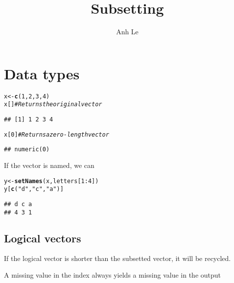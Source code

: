 \documentclass{article}\usepackage[]{graphicx}\usepackage[]{color}
\title{Subsetting}
\author{Anh Le}
\makeatletter
\newcommand{\hlnum}[1]{\textcolor[rgb]{0.686,0.059,0.569}{#1}}%
\newcommand{\hlstr}[1]{\textcolor[rgb]{0.192,0.494,0.8}{#1}}%
\newcommand{\hlcom}[1]{\textcolor[rgb]{0.678,0.584,0.686}{\textit{#1}}}%
\newcommand{\hlopt}[1]{\textcolor[rgb]{0,0,0}{#1}}%
\newcommand{\hlstd}[1]{\textcolor[rgb]{0.345,0.345,0.345}{#1}}%
\newcommand{\hlkwb}[1]{\textcolor[rgb]{0.69,0.353,0.396}{#1}}%
\newcommand{\hlkwd}[1]{\textcolor[rgb]{0.737,0.353,0.396}{\textbf{#1}}}%
\newenvironment{kframe}{%
 \def\at@end@of@kframe{}%
 \ifinner\ifhmode%
  \def\at@end@of@kframe{\end{minipage}}%
  \begin{minipage}{\columnwidth}%
 \fi\fi%
 \def\FrameCommand##1{\hskip\@totalleftmargin \hskip-\fboxsep
 \colorbox{shadecolor}{##1}\hskip-\fboxsep
     \hskip-\linewidth \hskip-\@totalleftmargin \hskip\columnwidth}%
 \MakeFramed {\advance\hsize-\width
   \@totalleftmargin\z@ \linewidth\hsize
   \@setminipage}}%
 {\par\unskip\endMakeFramed%
 \at@end@of@kframe}
\newenvironment{knitrout}{}{} %
\makeatother
\begin{document}
\maketitle

\section{Data types}

\begin{knitrout}
\color{fgcolor}\begin{kframe}
\begin{alltt}
\hlstd{x} \hlkwb{<-} \hlkwd{c}\hlstd{(}\hlnum{1}\hlstd{,} \hlnum{2}\hlstd{,} \hlnum{3}\hlstd{,} \hlnum{4}\hlstd{)}
\hlstd{x[]} \hlcom{# Returns the original vector}
\end{alltt}
\begin{verbatim}
## [1] 1 2 3 4
\end{verbatim}
\begin{alltt}
\hlstd{x[}\hlnum{0}\hlstd{]} \hlcom{# Returns a zero-length vector}
\end{alltt}
\begin{verbatim}
## numeric(0)
\end{verbatim}
\end{kframe}
\end{knitrout}

If the vector is named, we can
\begin{knitrout}
\color{fgcolor}\begin{kframe}
\begin{alltt}
\hlstd{y} \hlkwb{<-} \hlkwd{setNames}\hlstd{(x, letters[}\hlnum{1}\hlopt{:}\hlnum{4}\hlstd{])}
\hlstd{y[}\hlkwd{c}\hlstd{(}\hlstr{"d"}\hlstd{,} \hlstr{"c"}\hlstd{,} \hlstr{"a"}\hlstd{)]}
\end{alltt}
\begin{verbatim}
## d c a 
## 4 3 1
\end{verbatim}
\end{kframe}
\end{knitrout}

\subsection{Logical vectors}

If the logical vector is shorter than the subsetted vector, it will be recycled.

A missing value in the index always yields a missing value in the output
\end{document}

